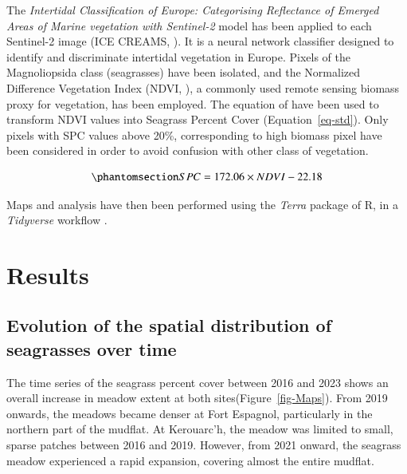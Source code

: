 \documentclass[
  number]{elsarticle}
\begin{document}
The \emph{Intertidal Classification of Europe: Categorising Reflectance
of Emerged Areas of Marine vegetation with Sentinel-2} model has been
applied to each Sentinel-2 image (ICE CREAMS, \citep{Davies2024}). It is
a neural network classifier designed to identify and discriminate
intertidal vegetation in Europe. Pixels of the Magnoliopsida class
(seagrasses) have been isolated, and the Normalized Difference
Vegetation Index (NDVI, \citep{rouse1974monitoring}), a commonly used
remote sensing biomass proxy for vegetation, has been employed. The
equation of \citep{zoffoli2020sentinel} have been used to transform NDVI
values into Seagrass Percent Cover (Equation~\ref{eq-std}). Only pixels
with SPC values above 20\%, corresponding to high biomass pixel have
been considered in order to avoid confusion with other class of
vegetation.

\begin{equation}\phantomsection\label{eq-std}{
SPC = 172.06 \times NDVI - 22.18
}\end{equation}

Maps and analysis have then been performed using the \emph{Terra}
package of R, in a \emph{Tidyverse} workflow
\citep{hijmans2023terra, wickham2017easily}.

\section{Results}\label{results}

\subsection{Evolution of the spatial distribution of seagrasses over
time}\label{evolution-of-the-spatial-distribution-of-seagrasses-over-time}

The time series of the seagrass percent cover between 2016 and 2023
shows an overall increase in meadow extent at both
sites(Figure~\ref{fig-Maps}). From 2019 onwards, the meadows became
denser at Fort Espagnol, particularly in the northern part of the
mudflat. At Kerouarc'h, the meadow was limited to small, sparse patches
between 2016 and 2019. However, from 2021 onward, the seagrass meadow
experienced a rapid expansion, covering almost the entire mudflat.
\end{document}
